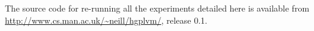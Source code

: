\documentclass[english,color,smalltitle]{manchesterposter}
\begin{document}
\begin{multicols}{5}{\LARGE \par}
\begin{columnbox}
\end{columnbox}


\begin{columnbox}
\-


\medskip{}
{\footnotesize The source code for re-running all the experiments
detailed here is available from \url{http://www.cs.man.ac.uk/~neill/hgplvm/},
release 0.1. }{\footnotesize \par}

\end{columnbox}


\begin{columnbox}
\-

{\footnotesize 

}{\footnotesize \par}

\end{columnbox}


\end{multicols}
\end{document}
